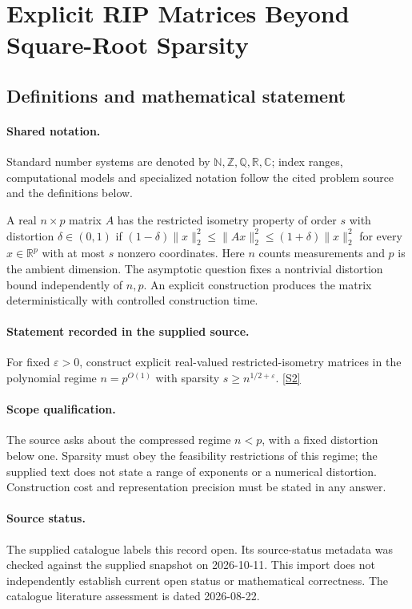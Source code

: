 \documentclass[11pt]{article}
\newcommand{\sref}[2]{\hyperlink{source:#1:#2}{[S#2]}}
\begin{document}
\section{Explicit RIP Matrices Beyond Square-Root Sparsity}\label{statement}

\subsection{Definitions and mathematical statement}

\paragraph{Shared notation.}Standard number systems are denoted by $\mathbb N,\mathbb Z,\mathbb Q,\mathbb R,\mathbb C$; index ranges, computational models and specialized notation follow the cited problem source and the definitions below.


A real $n\times p$ matrix $A$ has the restricted isometry property of order $s$ with distortion $\delta\in(0,1)$ if $(1-\delta)\|x\|_2^2\leq\|Ax\|_2^2\leq(1+\delta)\|x\|_2^2$ for every $x\in\mathbb R^p$ with at most $s$ nonzero coordinates. Here $n$ counts measurements and $p$ is the ambient dimension. The asymptotic question fixes a nontrivial distortion bound independently of $n,p$. An explicit construction produces the matrix deterministically with controlled construction time.
\paragraph{Statement recorded in the supplied source.}
For fixed $\varepsilon>0$, construct explicit real-valued restricted-isometry matrices in the polynomial regime $n=p^{O(1)}$ with sparsity $s\geq n^{1/2+\varepsilon}$. \sref{statement}{2}
\paragraph{Scope qualification.}
The source asks about the compressed regime $n<p$, with a fixed distortion below one. Sparsity must obey the feasibility restrictions of this regime; the supplied text does not state a range of exponents or a numerical distortion. Construction cost and representation precision must be stated in any answer.
\paragraph{Source status.}
The supplied catalogue labels this record open. Its source-status metadata was checked against the supplied snapshot on 2026-10-11. This import does not independently establish current open status or mathematical correctness. The catalogue literature assessment is dated 2026-08-22.
\end{document}
